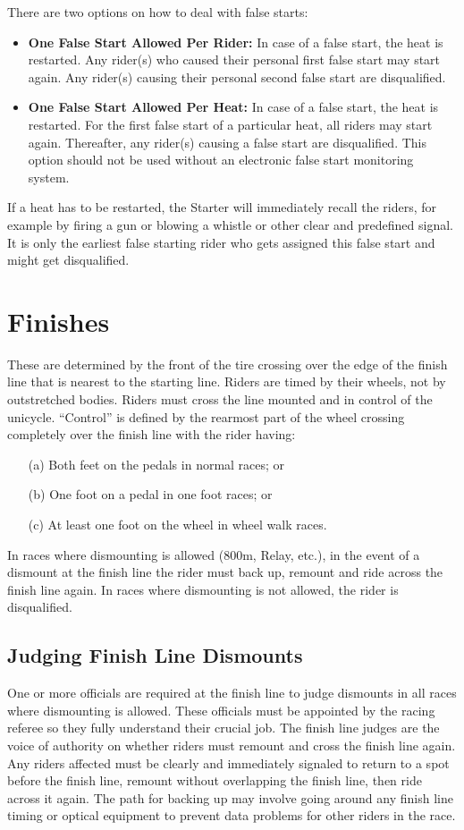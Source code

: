 There are two options on how to deal with false starts:
\begin{itemize}
\item \textbf{One False Start Allowed Per Rider:}
In case of a false start, the heat is restarted.
Any rider(s) who caused their personal first false start may start again.
Any rider(s) causing their personal second false start are disqualified.
\item \textbf{One False Start Allowed Per Heat:} 
In case of a false start, the heat is restarted.
For the first false start of a particular heat, all riders may start again.
Thereafter, any rider(s) causing a false start are disqualified.
This option should not be used without an electronic false start monitoring system.
\end{itemize}
If a heat has to be restarted, the Starter will immediately recall the riders, for example by firing a gun or blowing a whistle or other clear and predefined signal.
It is only the earliest false starting rider who gets assigned this false start and might get disqualified.

\section{Finishes \label{sec:track-field_finishes}}
These are determined by the front of the tire crossing over the edge of the finish line that is nearest to the starting line.
Riders are timed by their wheels, not by outstretched bodies.
Riders must cross the line mounted and in control of the unicycle.
``Control'' is defined by the rearmost part of the wheel crossing completely over the finish line with the rider having: 
\begin{enumerate}
\item[(a)] Both feet on the pedals in normal races; or 
\item[(b)] One foot on a pedal in one foot races; or 
\item[(c)] At least one foot on the wheel in wheel walk races.
\end{enumerate}
In races where dismounting is allowed (800m, Relay, etc.), in the event of a dismount at the finish line the rider must back up, remount and ride across the finish line again.
In races where dismounting is not allowed, the rider is disqualified.

\subsection{Judging Finish Line Dismounts}
One or more officials are required at the finish line to judge dismounts in all races where dismounting is allowed.
These officials must be appointed by the racing referee so they fully understand their crucial job.
The finish line judges are the voice of authority on whether riders must remount and cross the finish line again.
Any riders affected must be clearly and immediately signaled to return to a spot before the finish line, remount without overlapping the finish line, then ride across it again.
The path for backing up may involve going around any finish line timing or optical equipment to prevent data problems for other riders in the race.


